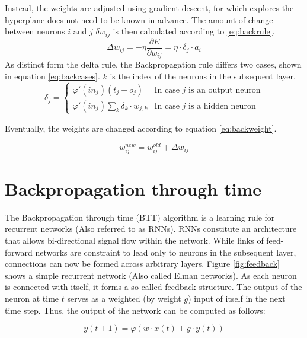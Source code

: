\documentclass[10pt,a4paper,DIV=11]{scrreprt}
\begin{document}
Instead, the weights are adjusted using gradient descent, for which explores the hyperplane does not need to be known in advance. 
The amount of change between neurons $i$ and $j$ $\delta w_{ij}$ is then calculated according to \eqref{eq:backrule}.
\begin{equation}
\Delta w_{ij} = -\eta \frac{\partial E}{\partial w_{ij}} = \eta \cdot \delta_j \cdot a_i
\label{eq:backrule}
\end{equation}
As distinct form the delta rule, the Backpropagation rule differs two cases, shown in equation \eqref{eq:backcases}. 
$k$ is the index of the neurons in the subsequent layer.
\begin{equation}
   \delta_j =
   \begin{cases}
     \varphi'(in_j)(t_j-o_j) & \text{In case $j$ is an output neuron} \\
     \varphi'(in_j)\sum_{k} \delta_k \cdot w_{j,k} & \text{In case $j$ is a hidden neuron}
   \end{cases}
\label{eq:backcases}
\end{equation}

Eventually, the weights are changed according to equation \eqref{eq:backweight}.

\begin{equation}
   w_{ij}^{new} = w_{ij}^{old} + \Delta w_{ij}
\label{eq:backweight}
\end{equation}

\section{Backpropagation through time}

The Backpropagation through time (BTT) algorithm is a learning rule for recurrent networks (Also referred to as RNNs). 
RNNs constitute an architecture that allows bi-directional signal flow within the network. While links of feed-forward networks are constraint to 
lead only to neurons in the subsequent layer, connections can now be formed across arbitrary layers. Figure \ref{fig:feedback} shows a 
simple recurrent network (Also called Elman networks). As each neuron is connected with itself, it forms a so-called feedback structure. 
The output of the neuron at time $t$ serves as a weighted (by weight $g$) input of itself in the next time step.
Thus, the output of the network can be computed as follows:

\begin{equation}
    y(t+1) = \varphi(w\cdot x(t) + g\cdot y(t))
\label{eq:btt}
\end{equation}
\end{document}
